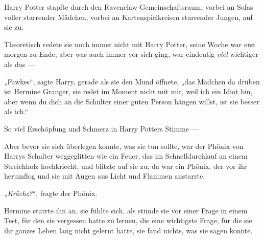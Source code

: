 Harry Potter stapfte durch den Ravenclaw-Gemeinschaftsraum, vorbei an Sofas voller starrender Mädchen, vorbei an Kartenspielkreisen starrender Jungen, auf sie zu.

Theoretisch redete sie noch immer nicht mit Harry Potter, seine Woche war erst morgen zu Ende, aber was auch immer vor sich ging, war eindeutig \emph{viel} wichtiger als das —

„Fawkes“, sagte Harry, gerade als sie den Mund öffnete, „das Mädchen da drüben ist Hermine Granger, sie redet im Moment nicht mit mir, weil ich ein Idiot bin, aber wenn du dich an die Schulter einer guten Person hängen willst, ist sie besser als ich.“

So viel Erschöpfung und Schmerz in Harry Potters Stimme —

Aber bevor sie sich überlegen konnte, was sie tun sollte, war der Phönix von Harrys Schulter weggeglitten wie ein Feuer, das im Schnelldurchlauf an einem Streichholz hochkriecht, und blitzte auf sie zu; da war ein Phönix, der vor ihr herumflog und sie mit Augen aus Licht und Flammen anstarrte.

„\emph{Krächz?}“, fragte der Phönix.

Hermine starrte ihn an, sie fühlte sich, als stünde sie vor einer Frage in einem Test, für den sie vergessen hatte zu lernen, die eine wichtigste Frage, für die sie ihr ganzes Leben lang nicht gelernt hatte, sie fand nichts, was sie sagen konnte.

